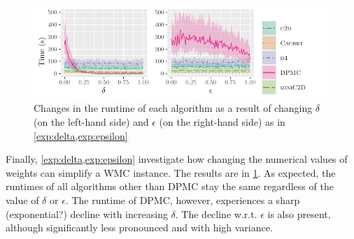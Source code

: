 \documentclass[runningheads]{llncs}
\begin{document}
\begin{figure}[t]
  \centering
  \includegraphics{delta_epsilon}
  \caption{Changes in the runtime of each algorithm as a result of changing
    $\delta$ (on the left-hand side) and $\epsilon$ (on the right-hand side) as
    in \cref{exp:delta,exp:epsilon}}\label{fig:delta_epsilon}
\end{figure}

Finally, \cref{exp:delta,exp:epsilon} investigate how changing the numerical
values of weights can simplify a \textsf{WMC} instance. The results are in
\cref{fig:delta_epsilon}. As expected, the runtimes of all algorithms other than
\textsc{DPMC} stay the same regardless of the value of $\delta$ or $\epsilon$.
The runtime of \textsc{DPMC}, however, experiences a sharp (exponential?)
decline with increasing $\delta$. The decline w.r.t. $\epsilon$ is also present,
although significantly less pronounced and with high variance.

\end{document}

